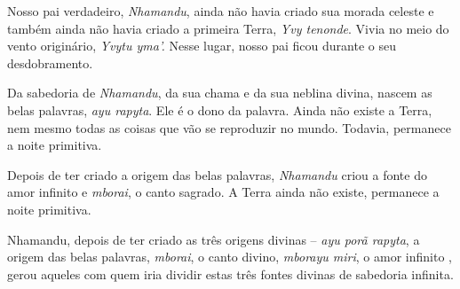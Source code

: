 
 

Nosso pai verdadeiro, \emph{Nhamandu}, ainda não havia criado sua morada
celeste e também ainda não havia criado a primeira Terra, \emph{Yvy
tenonde}. Vivia no meio do vento originário, \emph{Yvytu yma'.} Nesse
lugar, nosso pai ficou durante o seu desdobramento.

Da sabedoria de \emph{Nhamandu}, da sua chama e da sua neblina divina,
nascem as belas palavras, \emph{ayu rapyta}. Ele é o dono da palavra.
Ainda não existe a Terra, nem mesmo todas as coisas que vão se
reproduzir no mundo. Todavia, permanece a noite primitiva.

Depois de ter criado a origem das belas palavras, \emph{Nhamandu} criou
a fonte do amor infinito e \emph{mborai}, o canto sagrado. A Terra ainda
não existe, permanece a noite primitiva.

Nhamandu, depois de ter criado as três origens divinas -- \emph{ayu porã
rapyta}, a origem das belas palavras, \emph{mborai}, o canto divino,
\emph{mborayu miri}, o amor infinito , gerou aqueles com quem iria
dividir estas três fontes divinas de sabedoria infinita.
